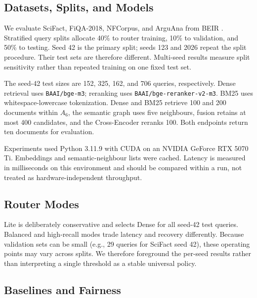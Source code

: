 \documentclass[10pt,journal]{IEEEtran}
\begin{document}
\subsection{Datasets, Splits, and Models}

We evaluate SciFact, FiQA-2018, NFCorpus, and ArguAna from BEIR \cite{thakur2021beir}. Stratified query splits allocate 40\% to router training, 10\% to validation, and 50\% to testing. Seed 42 is the primary split; seeds 123 and 2026 repeat the split procedure. Their test sets are therefore different. Multi-seed results measure split sensitivity rather than repeated training on one fixed test set.

The seed-42 test sizes are 152, 325, 162, and 706 queries, respectively. Dense retrieval uses \texttt{BAAI/bge-m3}; reranking uses \texttt{BAAI/bge-reranker-v2-m3}. BM25 uses whitespace-lowercase tokenization. Dense and BM25 retrieve 100 and 200 documents within $A_6$, the semantic graph uses five neighbours, fusion retains at most 400 candidates, and the Cross-Encoder reranks 100. Both endpoints return ten documents for evaluation.

Experiments used Python 3.11.9 with CUDA on an NVIDIA GeForce RTX 5070 Ti. Embeddings and semantic-neighbour lists were cached. Latency is measured in milliseconds on this environment and should be compared within a run, not treated as hardware-independent throughput.

\subsection{Router Modes}

Lite is deliberately conservative and selects Dense for all seed-42 test queries. Balanced and high-recall modes trade latency and recovery differently. Because validation sets can be small (e.g., 29 queries for SciFact seed 42), these operating points may vary across splits. We therefore foreground the per-seed results rather than interpreting a single threshold as a stable universal policy.

\subsection{Baselines and Fairness}
\end{document}
